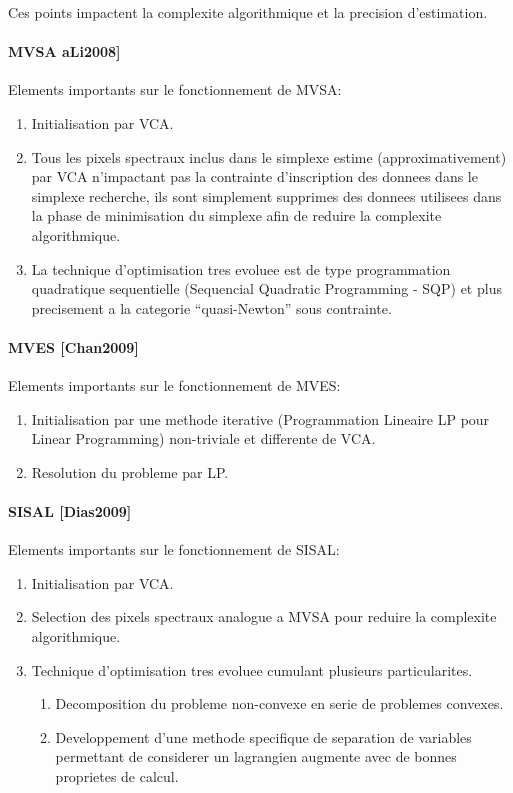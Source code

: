  
Ces points impactent la complexite algorithmique et la precision
d'estimation. 
 
\paragraph{MVSA aLi2008]} 
Elements importants sur le fonctionnement de MVSA: 
\begin{enumerate}
\item {Initialisation par VCA.}
\item {Tous les pixels spectraux inclus dans le simplexe estime
  (approximativement) par VCA n'impactant pas la contrainte
  d'inscription des donnees dans le simplexe recherche, ils sont
  simplement supprimes des donnees utilisees dans la phase de
  minimisation du simplexe afin de reduire la complexite
  algorithmique.}
\item {La technique d'optimisation tres evoluee est de type
  programmation quadratique sequentielle (Sequencial Quadratic
  Programming - SQP) et plus precisement a la categorie
  ``quasi-Newton'' sous contrainte.}
\end{enumerate} 

\paragraph{MVES [Chan2009]}
 Elements importants sur le fonctionnement de MVES: 
\begin{enumerate}
\item {Initialisation par une
  methode iterative (Programmation Lineaire LP pour Linear
  Programming) non-triviale et differente de VCA.}
\item {Resolution du
  probleme par LP.}
\end{enumerate} 
 

\paragraph{SISAL [Dias2009]}
Elements importants sur le fonctionnement de SISAL: 
\begin{enumerate}
\item {Initialisation
par VCA.}
\item {Selection des pixels spectraux analogue a MVSA pour reduire
la complexite algorithmique.}
\item {Technique d'optimisation tres evoluee
cumulant plusieurs particularites.}
\begin{enumerate}
\item {Decomposition du probleme
non-convexe en serie de problemes convexes.}
\item {Developpement d'une
methode specifique de separation de variables permettant de considerer
un lagrangien augmente avec de bonnes proprietes de calcul.}
\end{enumerate}
\end{enumerate} 

